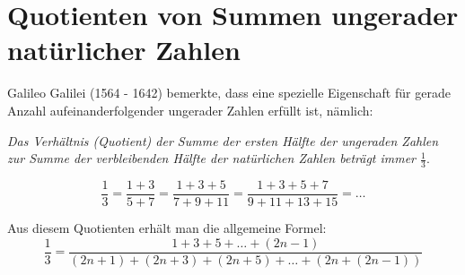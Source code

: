 %
%

\chapter{Quotienten von Summen ungerader natürlicher Zahlen}

Galileo Galilei (1564 - 1642) bemerkte, dass eine spezielle
Eigenschaft für gerade Anzahl aufeinanderfolgender ungerader
Zahlen erfüllt ist, nämlich:

\textit{
Das Verhältnis (Quotient) der Summe der ersten Hälfte der
ungeraden Zahlen zur Summe der verbleibenden
Hälfte der natürlichen Zahlen beträgt immer
$\frac{1}{3}$}.

\[
 \frac{1}{3} = \frac{1+3}{5+7} = \frac{1+3+5}{7+9+11}
 = \frac{1+3+5+7}{9+11+13+15} = \dots
\]

Aus diesem Quotienten erhält man die allgemeine Formel:
\[
 \frac{1}{3} = \frac{1+3+5+\dots+(2n-1)}{(2n+1)+(2n+3)+(2n+5)+\dots+(2n+(2n-1))}
\]

